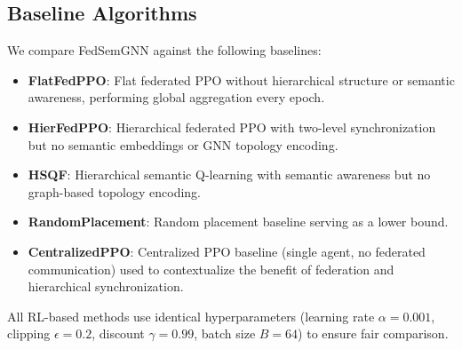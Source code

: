 \documentclass[conference]{IEEEtran}
\begin{document}
		\subsection{Baseline Algorithms}
		We compare FedSemGNN against the following baselines:
		
		\begin{itemize}
			\item \textbf{FlatFedPPO}: Flat federated PPO without hierarchical structure or semantic awareness, performing global aggregation every epoch.
			\item \textbf{HierFedPPO}: Hierarchical federated PPO with two-level synchronization but no semantic embeddings or GNN topology encoding.
			\item \textbf{HSQF}: Hierarchical semantic Q-learning with semantic awareness but no graph-based topology encoding.
			\item \textbf{RandomPlacement}: Random placement baseline serving as a lower bound.
			\item \textbf{CentralizedPPO}: Centralized PPO baseline (single agent, no federated communication) used to contextualize the benefit of federation and hierarchical synchronization.
		\end{itemize}
		
		All RL-based methods use identical hyperparameters (learning rate $\alpha = 0.001$, clipping $\epsilon = 0.2$, discount $\gamma = 0.99$, batch size $B = 64$) to ensure fair comparison.
		
\end{document}
